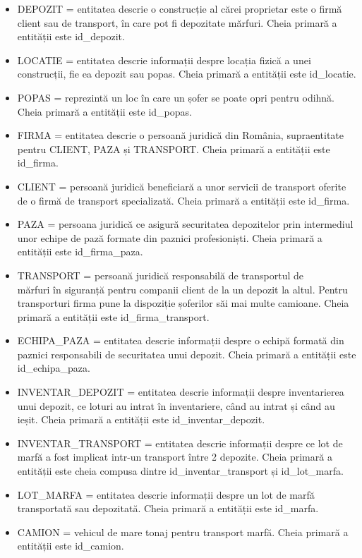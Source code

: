 \documentclass[12pt, a4paper]{article}
\begin{document}
\begin{itemize}
    \item DEPOZIT = entitatea descrie o construcție al cărei proprietar este o firmă client sau de transport, în care pot fi depozitate mărfuri. Cheia primară a entității este id\_depozit.
    \item LOCATIE = entitatea descrie informații despre locația fizică a unei construcții, fie ea depozit sau popas. Cheia primară a entității este id\_locatie.
    \item POPAS = reprezintă un loc în care un șofer se poate opri pentru odihnă. Cheia primară a entității este id\_popas.
    \item FIRMA = entitatea descrie o persoană juridică din România, supraentitate pentru CLIENT, PAZA și TRANSPORT. Cheia primară a entității este id\_firma.
    \item CLIENT = persoană juridică beneficiară a unor servicii de transport oferite de o firmă de transport specializată. Cheia primară a entității este id\_firma.
    \item PAZA = persoana juridică ce asigură securitatea depozitelor prin intermediul unor echipe de pază formate din paznici profesioniști. Cheia primară a entității este id\_firma\_paza.
    \item TRANSPORT = persoană juridică responsabilă de transportul de\\ mărfuri în siguranță pentru companii client de la un depozit la altul. Pentru transporturi firma pune la dispoziție șoferilor săi mai multe camioane. Cheia primară a entității este id\_firma\_transport.
    \item ECHIPA\_PAZA = entitatea descrie informații despre o echipă formată din paznici responsabili de securitatea unui depozit. Cheia primară a entității este id\_echipa\_paza.
    \item INVENTAR\_DEPOZIT = entitatea descrie informații despre inventarierea unui depozit, ce loturi au intrat în inventariere, când au intrat și când au ieșit. Cheia primară a entității este id\_inventar\_depozit.
    \item INVENTAR\_TRANSPORT = entitatea descrie informații despre ce lot de marfă a fost implicat intr-un transport între 2 depozite. Cheia primară a entității este cheia compusa dintre id\_inventar\_transport și id\_lot\_marfa.
    \item LOT\_MARFA = entitatea descrie informații despre un lot de marfă transportată sau depozitată. Cheia primară a entității este id\_marfa.
    \item CAMION = vehicul de mare tonaj pentru transport marfă. Cheia primară a entității este id\_camion.

\end{itemize}
\end{document}
